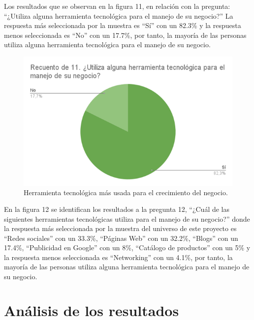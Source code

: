 \documentclass[12pt]{difu100cia} %
\begin{document}
Los resultados que se observan en la figura 11, en relación con la pregunta: “¿Utiliza alguna herramienta tecnológica para el manejo de su negocio?” La respuesta más seleccionada por la muestra es “Sí” con un 82.3\% y la respuesta menos seleccionada es “No” con un 17.7\%, por tanto, la mayoría de las personas utiliza alguna herramienta tecnológica para el manejo de su negocio.

\begin{figure}[!htb]
	\centering
	\includegraphics[width=\linewidth]{Figura 12.png}
	\caption{Herramienta tecnológica más usada para el crecimiento del negocio.}
	\label{Figur 12}
\end{figure}
	
En la figura 12 se identifican los resultados a la pregunta 12, “¿Cuál de las siguientes herramientas tecnológicas utiliza para el manejo de su negocio?” donde la respuesta más seleccionada por la muestra del universo de este proyecto es “Redes sociales” con un 33.3\%, “Páginas Web” con un 32.2\%, “Blogs” con un 17.4\%, “Publicidad en Google” con un 8\%, “Catálogo de productos” con un 5\% y la respuesta menos seleccionada es “Networking” con un 4.1\%, por tanto, la mayoría de las personas utiliza alguna herramienta tecnológica para el manejo de su negocio.


\section{Análisis de los resultados}
\label{Analisis de los resultados}
\end{document}
